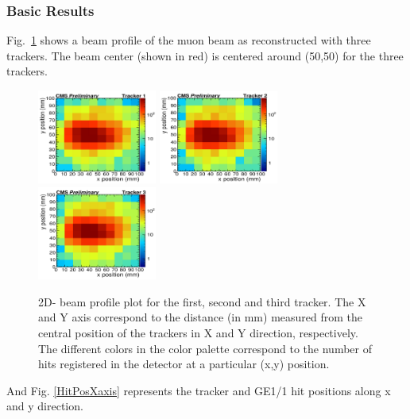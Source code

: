 \subsubsection{Basic Results} %
\label{ssub:basic_results}
Fig.~\ref{BeamProfile} shows a beam profile of the muon beam as reconstructed with three trackers. The beam center (shown in red) is centered around (50,50) for the three trackers.
\begin{figure}[!htbp]
\centering
\includegraphics[width=0.35\textwidth]{figures/GEM/Selection_027.png}%
\includegraphics[width=0.35\textwidth]{figures/GEM/Selection_028.png}%
\includegraphics[width=0.35\textwidth]{figures/GEM/Selection_029.png}
\caption{2D- beam profile plot for the first, second and third tracker. The X and Y axis correspond to the distance (in mm) measured from the central position of the trackers in X and Y direction, respectively. The different colors in the color palette correspond to the number of hits registered in the detector at a particular (x,y) position.}\label{BeamProfile}
\end{figure}
And Fig. \ref{HitPosXaxis} represents the tracker and GE1/1 hit positions along x and y direction.
